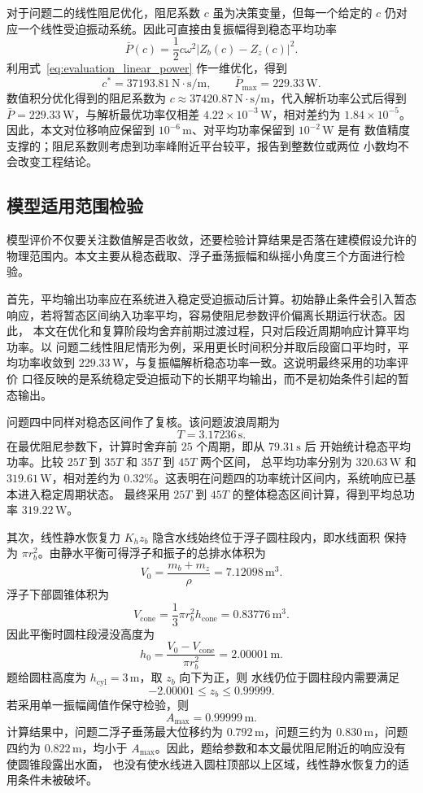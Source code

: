对于问题二的线性阻尼优化，阻尼系数 $c$ 虽为决策变量，但每一个给定的
$c$ 仍对应一个线性受迫振动系统。因此可直接由复振幅得到稳态平均功率
\begin{equation}
  \bar P(c)=
  \frac{1}{2}c\omega^2|Z_b(c)-Z_z(c)|^2 .
  \label{eq:evaluation_linear_power}
\end{equation}
利用式~\eqref{eq:evaluation_linear_power} 作一维优化，得到
\[
  c^\ast=37193.81\,\mathrm{N\cdot s/m},
  \qquad
  \bar P_{\max}=229.33\,\mathrm{W}.
\]
数值积分优化得到的阻尼系数为
$c\approx37420.87\,\mathrm{N\cdot s/m}$，代入解析功率公式后得到
$\bar P=229.33\,\mathrm{W}$，与解析最优功率仅相差
$4.22\times10^{-3}\,\mathrm{W}$，相对差约为
$1.84\times10^{-5}$。因此，本文对位移响应保留到
$10^{-6}\,\mathrm{m}$、对平均功率保留到 $10^{-2}\,\mathrm{W}$ 是有
数值精度支撑的；阻尼系数则考虑到功率峰附近平台较平，报告到整数位或两位
小数均不会改变工程结论。

\subsection{模型适用范围检验}

模型评价不仅要关注数值解是否收敛，还要检验计算结果是否落在建模假设允许的
物理范围内。本文主要从稳态截取、浮子垂荡振幅和纵摇小角度三个方面进行检验。

首先，平均输出功率应在系统进入稳定受迫振动后计算。初始静止条件会引入暂态
响应，若将暂态区间纳入功率平均，容易使阻尼参数评价偏离长期运行状态。因此，
本文在优化和复算阶段均舍弃前期过渡过程，只对后段近周期响应计算平均功率。以
问题二线性阻尼情形为例，采用更长时间积分并取后段窗口平均时，平均功率收敛到
$229.33\,\mathrm{W}$，与复振幅解析稳态功率一致。这说明最终采用的功率评价
口径反映的是系统稳定受迫振动下的长期平均输出，而不是初始条件引起的暂态输出。

问题四中同样对稳态区间作了复核。该问题波浪周期为
\[
  T=3.17236\,\mathrm{s}.
\]
在最优阻尼参数下，计算时舍弃前 $25$ 个周期，即从 $79.31\,\mathrm{s}$ 后
开始统计稳态平均功率。比较 $25T$ 到 $35T$ 和 $35T$ 到 $45T$ 两个区间，
总平均功率分别为 $320.63\,\mathrm{W}$ 和 $319.61\,\mathrm{W}$，相对差约为
$0.32\%$。这表明在问题四的功率统计区间内，系统响应已基本进入稳定周期状态。
最终采用 $25T$ 到 $45T$ 的整体稳态区间计算，得到平均总功率
$319.22\,\mathrm{W}$。

其次，线性静水恢复力 $K_hz_b$ 隐含水线始终位于浮子圆柱段内，即水线面积
保持为 $\pi r_b^2$。由静水平衡可得浮子和振子的总排水体积为
\[
  V_0=\frac{m_b+m_z}{\rho}=7.12098\,\mathrm{m^3}.
\]
浮子下部圆锥体积为
\[
  V_{\mathrm{cone}}=\frac{1}{3}\pi r_b^2h_{\mathrm{cone}}
  =0.83776\,\mathrm{m^3}.
\]
因此平衡时圆柱段浸没高度为
\[
  h_0=\frac{V_0-V_{\mathrm{cone}}}{\pi r_b^2}
  =2.00001\,\mathrm{m}.
\]
题给圆柱高度为 $h_{\mathrm{cyl}}=3\,\mathrm{m}$，取 $z_b$ 向下为正，则
水线仍位于圆柱段内需要满足
\[
  -2.00001\le z_b\le 0.99999.
\]
若采用单一振幅阈值作保守检验，则
\[
  A_{\max}=0.99999\,\mathrm{m}.
\]
计算结果中，问题二浮子垂荡最大位移约为 $0.792\,\mathrm{m}$，问题三约为
$0.830\,\mathrm{m}$，问题四约为 $0.822\,\mathrm{m}$，均小于
$A_{\max}$。因此，题给参数和本文最优阻尼附近的响应没有使圆锥段露出水面，
也没有使水线进入圆柱顶部以上区域，线性静水恢复力的适用条件未被破坏。

